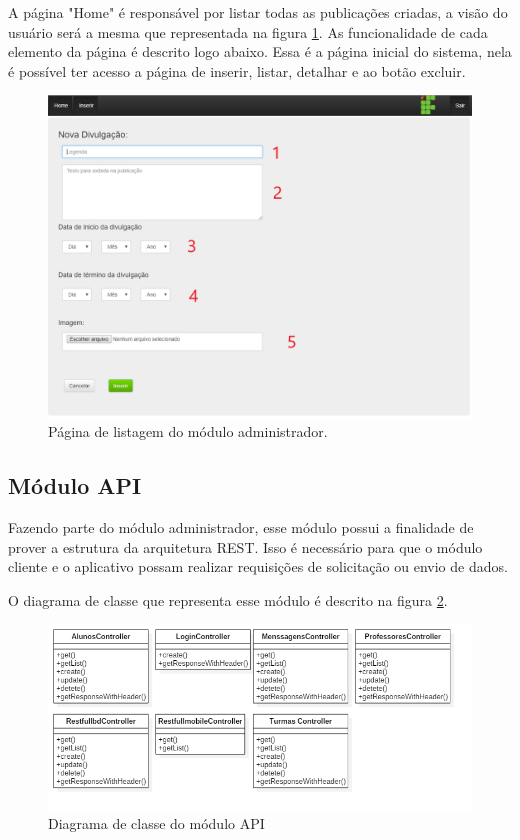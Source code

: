 A página "Home" é responsável por listar todas as publicações criadas, a visão do usuário será a mesma que representada na figura \ref{fig:administrador2}. As funcionalidade de cada elemento da página é descrito logo abaixo. Essa é a página inicial do sistema, nela é possível ter acesso a página de inserir, listar, detalhar e ao botão excluir.

\begin{figure}[H]
\centering
\includegraphics[scale=0.3]{figuras/administrador1}
\caption{Página de listagem  do módulo administrador.}
\label{fig:administrador2}
\end{figure}

\subsection{Módulo API}

Fazendo parte do módulo administrador, esse módulo possui a finalidade de prover a estrutura da arquitetura REST. Isso é necessário para que o módulo cliente e o aplicativo possam realizar requisições de solicitação ou envio de dados.

O diagrama de classe que representa esse módulo é descrito na figura \ref{fig:diagramaclasseAPI}.
\begin{figure}[H]
\centering
\includegraphics[scale=0.5]{figuras/diagramaclasseAPI}
\caption{Diagrama de classe do módulo API}
\label{fig:diagramaclasseAPI}
\end{figure}


